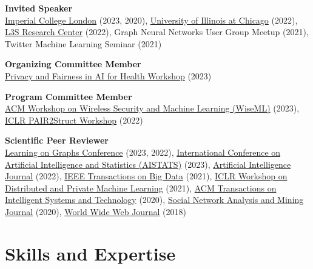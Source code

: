 \documentclass[11pt]{article}
\begin{document}
\begin{outerlist}
  \item \textbf{Invited Speaker}\\
  \href{https://www.imperial.ac.uk/}{Imperial College London} (2023, 2020), \href{https://www.uic.edu/}{University of Illinois at Chicago} (2022), \href{https://www.l3s.de/}{L3S Research Center} (2022), Graph Neural Networks User Group Meetup (2021), Twitter Machine Learning Seminar (2021)

	\item \textbf{Organizing Committee Member}\\
	\href{https://priv-fair-ai-uk.github.io}{Privacy and Fairness in AI for Health Workshop} (2023)

	\item \textbf{Program Committee Member}\\
	\href{https://wisec2023.surrey.ac.uk/wiseml2023/}{ACM Workshop on Wireless Security and Machine Learning (WiseML)} (2023),
	\href{https://pair2struct-workshop.github.io/}{ICLR PAIR2Struct Workshop} (2022)

	\item \textbf{Scientific Peer Reviewer}\\
	\href{https://logconference.org/}{Learning on Graphs Conference} (2023, 2022),
  \href{http://aistats.org/aistats2023/}{International Conference on Artificial Intelligence and Statistics (AISTATS)} (2023),
	\href{https://www.journals.elsevier.com/artificial-intelligence}{Artificial Intelligence Journal} (2022),
	\href{https://ieeexplore.ieee.org/xpl/RecentIssue.jsp?punumber=6687317}{IEEE Transactions on Big Data} (2021),
	\href{https://dp-ml.github.io/2021-workshop-ICLR/}{ICLR Workshop on Distributed and Private Machine Learning} (2021),
	\href{https://dl.acm.org/journal/tist}{ACM Transactions on Intelligent Systems and Technology} (2020),
	\href{https://www.springer.com/journal/13278}{Social Network Analysis and Mining Journal} (2020),
	\href{https://www.springer.com/journal/11280}{World Wide Web Journal} (2018)

\end{outerlist}

\section{Skills and Expertise}
\end{document}
